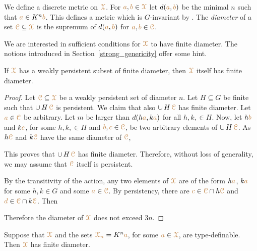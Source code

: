 We define a discrete metric on $\mrX$.
For ${\mr a},{\mr b}\in\mrX$ let $d({\mr a},{\mr b})$ be the minimal $n$ such that ${\mr a}\in K^n{\mr b}$.
This defines a metric which is $G$-invariant by .
The \emph{diameter\/} of a set $\mrC\subseteq\mrX$ is the supremum of $d({\mr a},{\mr b})$ for ${\mr a},{\mr b}\in\mrC$.

We are interested in sufficient conditions for $\mrX$ to have finite diameter.
The notions introduced in Section~\ref{strong_genericity} offer some hint.

\begin{proposition}\label{prop_wpers_finite_diameter}
  If $\mrX$ has a weakly persistent subset of finite diameter, then $\mrX$ itself has finite diameter.
\end{proposition}

\begin{proof}
  Let $\mrC\subseteq\mrX$ be a weakly persistent set of diameter $n$.
  Let $H\subseteq G$ be finite such that $\cup\,H\,\mrC$ is persistent.
  We claim that also $\cup\,H\,\mrC$ has finite diameter.
  Let ${\mr a}\in\mrC$ be arbitrary.
  Let $m$ be larger than $d(h{\mr a}, k{\mr a})$ for all $h,k,\in H$.
  Now, let $h{\mr b}$ and $k{\mr c}$, for some $h,k,\in H$ and ${\mr b},{\mr c}\in\mrC$, be two arbitrary elements of $\cup\,H\,\mrC$.
  As $h\mrC$ and $k\mrC$ have the same diameter of $\mrC$, 



  This proves that $\cup\,H\,\mrC$ has finite diameter.
  Therefore, without loss of generality, we may assume that $\mrC$ itself is persistent.
  
  By the transitivity of the action, any two elements of $\mrX$ are of the form $h{\mr a}$, $k{\mr a}$ for some $h,k\in G$ and some ${\mr a}\in\mrC$.
  By persistency, there are ${\mr c}\in\mrC\cap h\mrC$ and ${\mr d}\in\mrC\cap k\mrC$.
  Then 



  Therefore the diameter of $\mrX$ does not exceed $3n$.
\end{proof}

\begin{theorem}\label{thm_newelski}
  Suppose that $\mrX$ and the sets ${\mr\X_n}=K^n{\mr a}$, for some ${\mr a}\in\mrX$, are type-definable.
  Then $\mrX$ has finite diameter.
\end{theorem}

